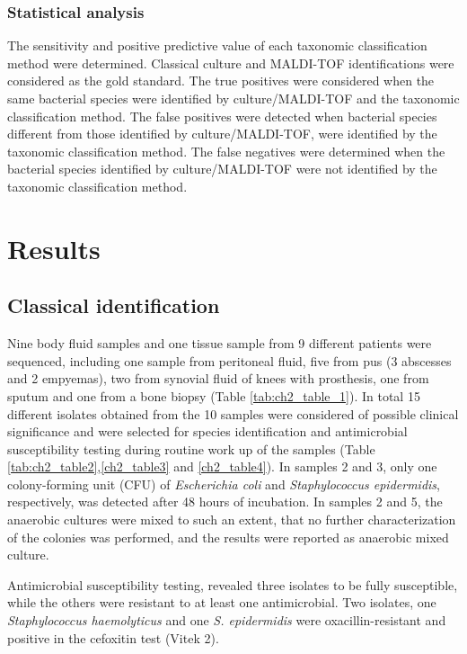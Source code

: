 \subsubsection{Statistical analysis}

The sensitivity and positive predictive value of each taxonomic classification method were determined. 
Classical culture and MALDI-TOF identifications were considered as the gold standard. 
The true positives were considered when the same bacterial species were identified by culture/MALDI-TOF and the taxonomic classification method. 
The false positives were detected when bacterial species different from those identified by culture/MALDI-TOF, were identified by the taxonomic classification method. 
The false negatives were determined when the bacterial species identified by culture/MALDI-TOF were not identified by the taxonomic classification method.

\section{Results} \label{sec:ch2_results}

\subsection{Classical identification}

Nine body fluid samples and one tissue sample from 9 different patients were sequenced, including one sample from peritoneal fluid, five from pus (3 abscesses and 2 empyemas), two from synovial fluid of knees with prosthesis, one from sputum and one from a bone biopsy (Table \ref{tab:ch2_table_1}).
In total 15 different isolates obtained from the 10 samples were considered of possible clinical significance and were selected for species identification and antimicrobial susceptibility testing during routine work up of the samples (Table \ref{tab:ch2_table2},\ref{ch2_table3} and \ref{ch2_table4}).
In samples 2 and 3, only one colony-forming unit (CFU) of \textit{Escherichia coli} and \textit{Staphylococcus epidermidis}, respectively, was detected after 48 hours of incubation. 
In samples 2 and 5, the anaerobic cultures were mixed to such an extent, that no further characterization of the colonies was performed, and the results were reported as anaerobic mixed culture.

Antimicrobial susceptibility testing, revealed three isolates to be fully susceptible, while the others were resistant to at least one antimicrobial. 
Two isolates, one \textit{Staphylococcus haemolyticus} and one \textit{S. epidermidis} were oxacillin-resistant and positive in the cefoxitin test (Vitek 2).

